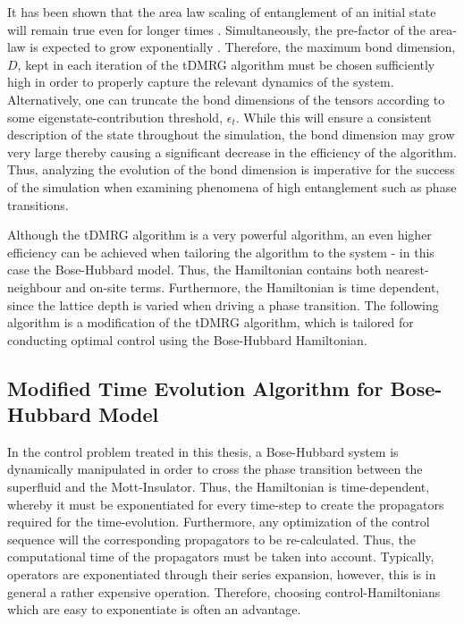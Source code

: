 It has been shown that the area law scaling of entanglement of an initial state will remain true even for longer times \cite{Bravyi2006,Eisert2006}. Simultaneously, the pre-factor of the area-law is expected to grow exponentially \cite{Schuch2008}. Therefore, the maximum bond dimension, $D$, kept in each iteration of the tDMRG algorithm must be chosen sufficiently high in order to properly capture the relevant dynamics of the system. Alternatively, one can truncate the bond dimensions of the tensors according to some eigenstate-contribution threshold, $\epsilon_t$. While this will ensure a consistent description of the state throughout the simulation, the bond dimension may grow very large thereby causing a significant decrease in the efficiency of the algorithm. Thus, analyzing the evolution of the bond dimension is imperative for the success of the simulation when examining phenomena of high entanglement such as phase transitions.

Although the tDMRG algorithm is a very powerful algorithm, an even higher efficiency can be achieved when tailoring the algorithm to the system - in this case the Bose-Hubbard model. Thus, the Hamiltonian contains both nearest-neighbour and on-site terms. Furthermore, the Hamiltonian is time dependent, since the lattice depth is varied when driving a phase transition. The following algorithm is a modification of the tDMRG algorithm, which is tailored for conducting optimal control using the Bose-Hubbard Hamiltonian.


\subsection{Modified Time Evolution Algorithm for Bose-Hubbard Model}
\label{sec:modTMDRG}
In the control problem treated in this thesis, a Bose-Hubbard system is dynamically manipulated in order to cross the phase transition between the superfluid and the Mott-Insulator. Thus, the Hamiltonian is time-dependent, whereby it must be exponentiated for every time-step to create the propagators required for the time-evolution. Furthermore, any optimization of the control sequence will the corresponding propagators to be re-calculated. Thus, the computational time of the propagators must be taken into account. Typically, operators are exponentiated through their series expansion, however, this is in general a rather expensive operation. Therefore, choosing control-Hamiltonians which are easy to exponentiate is often an advantage.

